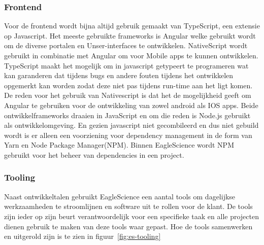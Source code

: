 \subsubsection{Frontend}
Voor de frontend wordt bijna altijd gebruik gemaakt van TypeScript, een extensie op Javascript. Het meeste gebruikte frameworks is Angular welke gebruikt wordt om de diverse portalen en Unser-interfaces te ontwikkelen. NativeScript wordt gebruikt in combinatie met Angular om voor Mobile apps te kunnen ontwikkelen. TypeScript maakt het mogelijk om in javascript getypeert te programeren wat kan garanderen dat tijdens bugs en andere fouten tijdens het ontwikkelen opgemerkt kan worden zodat deze niet pas tijdens run-time aan het ligt komen. De reden voor het gebruik van Nativescript is dat het de mogelijkheid geeft om Angular te gebruiken voor de ontwikkeling van zowel android als IOS apps.  Beide ontwikkelframeworks draaien in JavaScript en om die reden is Node.js gebruikt als ontwikkelomgeving. En gezien javascript niet gecombileerd en dus niet gebuild wordt is er alleen een voorziening voor dependency management in de form van Yarn en Node Package Manager(NPM). Binnen EagleScience wordt NPM
gebruikt voor het beheer van dependencies in een project.


\subsubsection{Tooling}\label{subsubsec:tooling}
Naast ontwikkeltalen gebruikt EagleScience een aantal tools om dagelijkse werkzaamheden te stroomlijnen en software uit te rollen voor de klant. De tools zijn ieder op zijn beurt verantwoordelijk voor een specifieke taak en alle projecten dienen gebruik te maken van deze tools waar gepast. Hoe de tools samenwerken en uitgerold zijn is te zien in figuur~\ref{fig:es-tooling}

